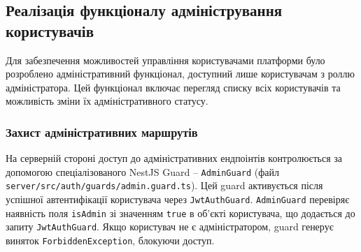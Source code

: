 \subsection{Реалізація функціоналу адміністрування користувачів}
\label{subsec:admin_user_management}
Для забезпечення можливостей управління користувачами платформи було розроблено адміністративний функціонал, доступний лише користувачам з роллю адміністратора. Цей функціонал включає перегляд списку всіх користувачів та можливість зміни їх адміністративного статусу.

\subsubsection{Захист адміністративних маршрутів}
На серверній стороні доступ до адміністративних ендпоінтів контролюється за допомогою спеціалізованого NestJS Guard – \texttt{AdminGuard} (файл \texttt{server/src/auth/guards/admin.guard.ts}). Цей guard активується після успішної автентифікації користувача через \texttt{JwtAuthGuard}. \texttt{AdminGuard} перевіряє наявність поля \texttt{isAdmin} зі значенням \texttt{true} в об'єкті користувача, що додається до запиту \texttt{JwtAuthGuard}. Якщо користувач не є адміністратором, guard генерує виняток \texttt{ForbiddenException}, блокуючи доступ.


